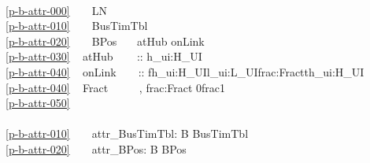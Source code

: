 {%
\bp
{}\\
\ref{p-b-attr-000}\ \ \ \ LN\\
\ref{p-b-attr-010}\ \ \ \ BusTimTbl \\
\ref{p-b-attr-020}\ \ \ \ BPos\ \ \ {\EQ}{\EQ} atHub {\BAR} onLink\\
\ref{p-b-attr-030}\ \ \,atHub\ \ \ \ \,:: h\_ui:H\_UI\\
\ref{p-b-attr-040}\ \ \,onLink\ \ \ \ :: fh\_ui:H\_UI{\TIMES}l\_ui:L\_UI{\TIMES}frac:Fract{\TIMES}th\_ui:H\_UI\\
\ref{p-b-attr-040}\ \ \,Fract\ \ \ \ \ {\EQ} ,  frac:Fract {\RDOT} 0{\LT}frac{\LT}1\\
\ref{p-b-attr-050}\ \ \ \ {\DOTDOTDOT}\\
\ \ \ \\
\ref{p-b-attr-010}\ \ \ \ attr\_BusTimTbl: B {\RIGHTARROW} BusTimTbl\\
\ref{p-b-attr-020}\ \ \ \ attr\_BPos: B {\RIGHTARROW} BPos
\ep


}
